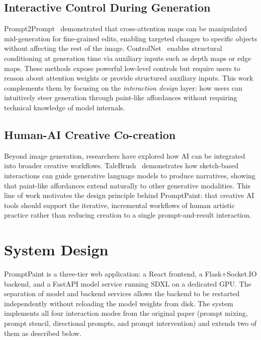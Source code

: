 \documentclass[sigconf]{acmart}
\begin{document}
\subsection{Interactive Control During Generation}

Prompt2Prompt~\cite{hertz2022prompt} demonstrated that cross-attention maps
can be manipulated mid-generation for fine-grained edits, enabling targeted
changes to specific objects without affecting the rest of the image.
ControlNet~\cite{zhang2023adding} enables structural conditioning at generation
time via auxiliary inputs such as depth maps or edge maps. These methods expose
powerful low-level controls but require users to reason about attention weights
or provide structured auxiliary inputs. This work complements them by focusing
on the \emph{interaction design} layer: how users can intuitively steer
generation through paint-like affordances without requiring technical knowledge
of model internals.

\subsection{Human-AI Creative Co-creation}

Beyond image generation, researchers have explored how AI can be integrated
into broader creative workflows. TaleBrush~\cite{chung2022talebrush} demonstrates
how sketch-based interactions can guide generative language models to produce
narratives, showing that paint-like affordances extend naturally to other
generative modalities. This line of work motivates the design principle behind
PromptPaint: that creative AI tools should support the iterative, incremental
workflows of human artistic practice rather than reducing creation to a
single prompt-and-result interaction.

\section{System Design}

PromptPaint is a three-tier web application: a React frontend, a Flask+Socket.IO
backend, and a FastAPI model service running SDXL on a dedicated GPU. The
separation of model and backend services allows the backend to be restarted
independently without reloading the model weights from disk. The system
implements all four interaction modes from the original paper (prompt mixing,
prompt stencil, directional prompts, and prompt intervention) and extends
two of them as described below.
\end{document}
